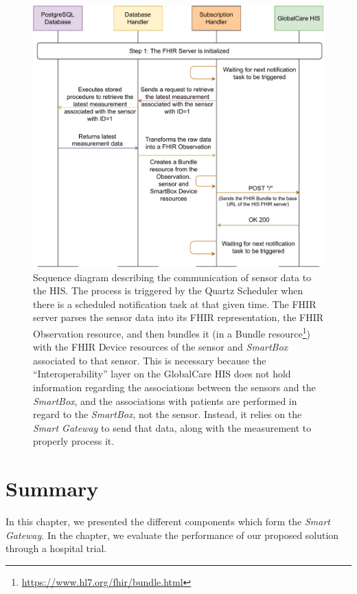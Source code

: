 \begin{figure}[H]
    \centering
    \includegraphics[width=\linewidth]{images/fhir post bundle.pdf}
    \caption[Sequence diagram describing the communication of sensor data to the \acs{HIS}.]{Sequence diagram describing the communication of sensor data to the \acs{HIS}. The process is triggered by the Quartz Scheduler when there is a scheduled notification task at that given time. The \acs{FHIR} server parses the sensor data into its \acs{FHIR} representation, the \acs{FHIR} Observation resource, and then bundles it (in a Bundle resource\footnote{\url{https://www.hl7.org/fhir/bundle.html}}) with the \acs{FHIR} Device resources of the sensor and \textit{SmartBox} associated to that sensor. This is necessary because the ``Interoperability'' layer on the GlobalCare \acs{HIS} does not hold information regarding the associations between the sensors and the \textit{SmartBox}, and the associations with patients are performed in regard to the \textit{SmartBox}, not the sensor. Instead, it relies on the \textit{Smart Gateway} to send that data, along with the measurement to properly process it.}
    \label{fig:fhir-post-bundle}
\end{figure} 

\section{Summary}

In this chapter, we presented the different components which form the \textit{Smart Gateway}. In the chapter, we evaluate the performance of our proposed solution through a hospital trial.
